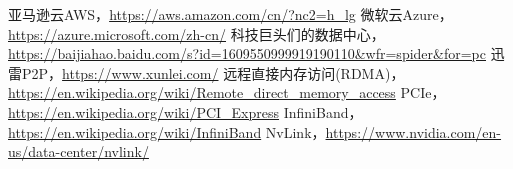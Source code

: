 \documentclass[logo,reportComp]{thesis}
\begin{document}
\begin{thebibliography}{99}
 亚马逊云AWS，\url{https://aws.amazon.com/cn/?nc2=h_lg}
 微软云Azure，\url{https://azure.microsoft.com/zh-cn/}
 科技巨头们的数据中心，\url{https://baijiahao.baidu.com/s?id=1609550999919190110&wfr=spider&for=pc}
 迅雷P2P，\url{https://www.xunlei.com/}
 远程直接内存访问(RDMA)，\url{https://en.wikipedia.org/wiki/Remote_direct_memory_access}
 PCIe，\url{https://en.wikipedia.org/wiki/PCI_Express}
 InfiniBand，\url{https://en.wikipedia.org/wiki/InfiniBand}
 NvLink，\url{https://www.nvidia.com/en-us/data-center/nvlink/}
\end{thebibliography}
\end{document}
